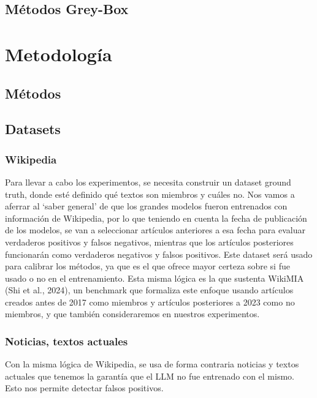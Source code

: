 \documentclass[11pt]{article}
\begin{document}
\subsection{Métodos Grey-Box}



\section{Metodología}

\subsection{Métodos}

\subsection{Datasets}
\subsubsection{Wikipedia}
Para llevar a cabo los experimentos, se necesita construir un dataset ground truth, donde esté definido qué textos son miembros y cuáles no. Nos vamos a aferrar al ‘saber general’ de que los grandes modelos fueron entrenados con información de Wikipedia, por lo que teniendo en cuenta la fecha de publicación de los modelos, se van a seleccionar artículos anteriores a esa fecha para evaluar verdaderos positivos y falsos negativos, mientras que los artículos posteriores funcionarán como verdaderos negativos y falsos positivos. Este dataset será usado para calibrar los métodos, ya que es el que ofrece mayor certeza sobre si fue usado o no en el entrenamiento. Esta misma lógica es la que sustenta WikiMIA (Shi et al., 2024), un benchmark que formaliza este enfoque usando artículos creados antes de 2017 como miembros y artículos posteriores a 2023 como no miembros, y que también consideraremos en nuestros experimentos. 

\subsubsection{Noticias, textos actuales}
Con la misma lógica de Wikipedia, se usa de forma contraria noticias y textos actuales que tenemos la garantía que el LLM no fue entrenado con el mismo. Esto nos permite detectar falsos positivos.
\end{document}
